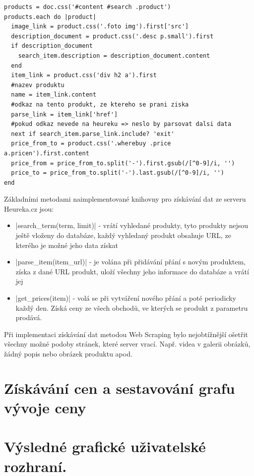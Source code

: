 \begin{lstlisting}
products = doc.css('#content #search .product')
products.each do |product|
  image_link = product.css('.foto img').first['src']
  description_document = product.css('.desc p.small').first
  if description_document
    search_item.description = description_document.content
  end
  item_link = product.css('div h2 a').first
  #nazev produktu
  name = item_link.content
  #odkaz na tento produkt, ze ktereho se prani ziska
  parse_link = item_link['href']
  #pokud odkaz nevede na heureku => neslo by parsovat dalsi data
  next if search_item.parse_link.include? 'exit'
  price_from_to = product.css('.wherebuy .price a.pricen').first.content
  price_from = price_from_to.split('-').first.gsub(/[^0-9]/i, '')
  price_to = price_from_to.split('-').last.gsub(/[^0-9]/i, '')
end
\end{lstlisting}

Základními metodami naimplementované knihovny pro získávání dat ze serveru Heureka.cz jsou:

\begin{itemize}
\item |search_term(term, limit)| - vrátí vyhledané produkty, tyto produkty nejsou ještě vloženy do databáze, každý vyhledaný produkt obsahuje URL, ze kterého je možné jeho data získat
\item |parse_item(item_url)| - je volána při přidávání přání s novým produktem, získa z dané URL produkt, uloží všechny jeho informace do databáze a vrátí jej
\item |get_prices(item)| - volá se při vytváření nového přání a poté periodicky každý den. Získá ceny ze všech obchodů, ve kterých se produkt z parametru prodává.
\end{itemize}

Při implementaci získávání dat metodou Web Scraping bylo nejobtížnější ošetřit všechny možné podoby stránek, které server vrací. Např. videa v galerii obrázků, žádný popis nebo obrázek produktu apod.

\section{Získávání cen a sestavování grafu vývoje ceny}

\section{Výsledné grafické uživatelské rozhraní.}
